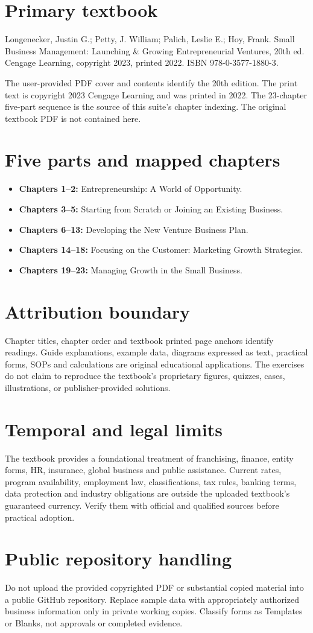 \documentclass[11pt]{article}
\begin{document}
\SuiteOpen
\section{Primary textbook}
Longenecker, Justin G.; Petty, J. William; Palich, Leslie E.; Hoy, Frank. Small Business Management: Launching \& Growing Entrepreneurial Ventures, 20th ed. Cengage Learning, copyright 2023, printed 2022. ISBN 978-0-3577-1880-3.\par The user-provided PDF cover and contents identify the 20th edition. The print text is copyright 2023 Cengage Learning and was printed in 2022. The 23-chapter five-part sequence is the source of this suite's chapter indexing. The original textbook PDF is not contained here.
\section{Five parts and mapped chapters}
\begin{itemize}[leftmargin=*]
\item \textbf{Chapters 1--2:} Entrepreneurship: A World of Opportunity.
\item \textbf{Chapters 3--5:} Starting from Scratch or Joining an Existing Business.
\item \textbf{Chapters 6--13:} Developing the New Venture Business Plan.
\item \textbf{Chapters 14--18:} Focusing on the Customer: Marketing Growth Strategies.
\item \textbf{Chapters 19--23:} Managing Growth in the Small Business.
\end{itemize}
\section{Attribution boundary}
Chapter titles, chapter order and textbook printed page anchors identify readings. Guide explanations, example data, diagrams expressed as text, practical forms, SOPs and calculations are original educational applications. The exercises do not claim to reproduce the textbook's proprietary figures, quizzes, cases, illustrations, or publisher-provided solutions.
\section{Temporal and legal limits}
The textbook provides a foundational treatment of franchising, finance, entity forms, HR, insurance, global business and public assistance. Current rates, program availability, employment law, classifications, tax rules, banking terms, data protection and industry obligations are outside the uploaded textbook's guaranteed currency. Verify them with official and qualified sources before practical adoption.
\section{Public repository handling}
Do not upload the provided copyrighted PDF or substantial copied material into a public GitHub repository. Replace sample data with appropriately authorized business information only in private working copies. Classify forms as Templates or Blanks, not approvals or completed evidence.
\end{document}
